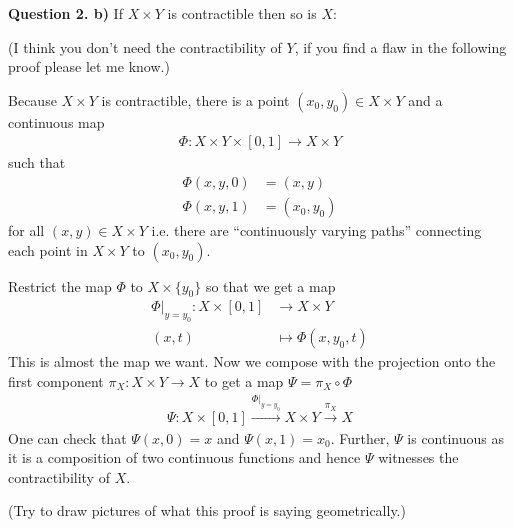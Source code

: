 \noindent \textbf{Question 2. b)} If $X \times Y$ is contractible then so is $X$:\\
\begin{addmargin}[2em]{0em}
(I think you don't need the contractibility of $Y$, if you find a flaw in the following proof please let me know.)

Because $X \times Y$ is contractible, there is a point $(x_0, y_0) \in X \times Y$ and a continuous map
\begin{align*}
  \Phi: X \times Y \times [0,1] \rightarrow X \times Y
\end{align*}
such that
\begin{align*}
  \Phi(x,y,0) & = (x,y)   \\
  \Phi(x,y,1) & = (x_0,y_0)
\end{align*}
for all $ (x,y) \in X \times Y$ i.e. there are ``continuously varying paths'' connecting each point in $ X \times Y$ to $ (x_0,y_0)$.

Restrict the map $\Phi$ to $X \times \{ y_0 \}$ so that we get a map
\begin{align*}
  \Phi|_{y=y_0}: X \times [0,1] &\rightarrow X \times Y \\
  (x,t) &\mapsto \Phi(x,y_0,t)
\end{align*}
This is almost the map we want. Now we compose with the projection onto the first component $\pi_X: X \times Y \rightarrow X$ to get a map $\Psi = \pi_X \circ \Phi$
\begin{align*}
  \Psi : X \times [0,1] \xrightarrow{\Phi|_{y=y_0}} X \times Y \xrightarrow{\pi_X} X
\end{align*}
One can check that $\Psi(x,0) = x $ and $\Psi(x,1) = x_0$. Further, $\Psi$ is continuous as it is a composition of two continuous functions and hence $\Psi$ witnesses the contractibility of $X$.

(Try to draw pictures of what this proof is saying geometrically.)
\end{addmargin}


